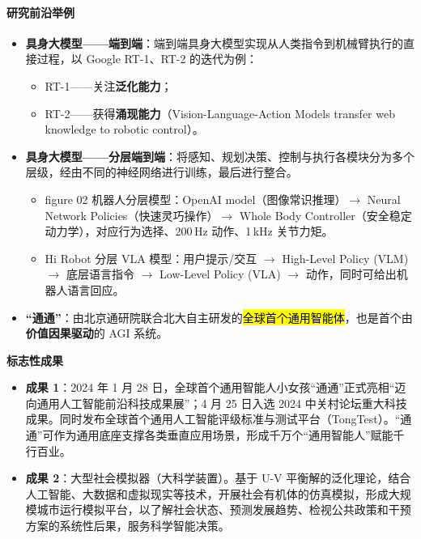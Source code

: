 \paragraph{研究前沿举例}

\begin{itemize}[itemsep=3pt]
    \item \textbf{具身大模型——端到端}：端到端具身大模型实现从人类指令到机械臂执行的直接过程，以 Google RT-1、RT-2 的迭代为例：
    \begin{itemize}
        \item RT-1——关注\textbf{泛化能力}；
        \item RT-2——获得\textbf{涌现能力}（Vision-Language-Action Models transfer web knowledge to robotic control）。
    \end{itemize}
    \item \textbf{具身大模型——分层端到端}：将感知、规划决策、控制与执行各模块分为多个层级，经由不同的神经网络进行训练，最后进行整合。
    \begin{itemize}
        \item figure 02 机器人分层模型：OpenAI model（图像常识推理）$\to$ Neural Network Policies（快速灵巧操作）$\to$ Whole Body Controller（安全稳定动力学），对应行为选择、200\,Hz 动作、1\,kHz 关节力矩。
        \item Hi Robot 分层 VLA 模型：用户提示/交互 $\to$ High-Level Policy (VLM) $\to$ 底层语言指令 $\to$ Low-Level Policy (VLA) $\to$ 动作，同时可给出机器人语言回应。
    \end{itemize}
    \item \textbf{“通通”}：由北京通研院联合北大自主研发的\hl{全球首个通用智能体}，也是首个由\textbf{价值因果驱动}的 AGI 系统。
\end{itemize}

\textbf{标志性成果}

\begin{itemize}[itemsep=2pt]
    \item \textbf{成果 1}：2024 年 1 月 28 日，全球首个通用智能人小女孩“通通”正式亮相“迈向通用人工智能前沿科技成果展”；4 月 25 日入选 2024 中关村论坛重大科技成果。同时发布全球首个通用人工智能评级标准与测试平台（TongTest）。“通通”可作为通用底座支撑各类垂直应用场景，形成千万个“通用智能人”赋能千行百业。
    \item \textbf{成果 2}：大型社会模拟器（大科学装置）。基于 U-V 平衡解的泛化理论，结合人工智能、大数据和虚拟现实等技术，开展社会有机体的仿真模拟，形成大规模城市运行模拟平台，以了解社会状态、预测发展趋势、检视公共政策和干预方案的系统性后果，服务科学智能决策。
\end{itemize}

